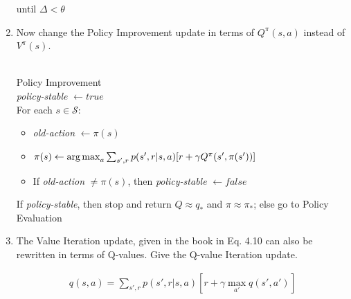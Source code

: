 \documentclass{exam}
\begin{document}
\begin{problem}
\begin{enumerate}
\begin{solutionorlines}[2in]
\begin{itemize}
\begin{itemize}
        \end{itemize}
    \end{itemize}
    until $\Delta < \theta$
    \end{solutionorlines}
    \item Now change the Policy Improvement update in terms of $Q^{\pi}(s, a)$ instead of $V^{\pi}(s)$.
    \begin{solutionorlines}[2in]
    \ \\
    Policy Improvement\\
    \textit{policy-stable} $\leftarrow true$\\
    For each $s \in \mathcal{S}$:
    \begin{itemize}[noitemsep,nolistsep]
        \item[ ] \textit{old-action} $\leftarrow \pi(s)$
        \item[ ] $\pi(s) \leftarrow \operatorname*{arg\,max}_a \sum_{s', r} p(s', r| s, a) [r + \gamma Q^{\pi}(s', \pi(s'))]$
        \item[ ] If \textit{old-action} $\neq \pi(s)$, then \textit{policy-stable} $\leftarrow false$
    \end{itemize}
    If \textit{policy-stable}, then stop and return $Q \approx q_*$ and $\pi \approx \pi_*$; else go to Policy Evaluation
    \end{solutionorlines}
    \item The Value Iteration update, given in the book in Eq. 4.10 can also be rewritten in terms of Q-values. Give the Q-value Iteration update.
    \begin{solutionorlines}[2in]
    \begin{align*}
        q(s, a) = \sum_{s', r} p(s', r| s, a) [r + \gamma \max_{a'} q(s', a')]
    \end{align*}
    

\end{solutionorlines}
\end{enumerate}
\end{problem}
\end{document}
